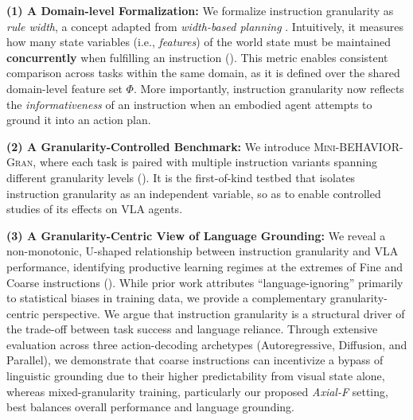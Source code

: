 \documentclass{article}
\begin{document}


\textbf{(1) A Domain-level Formalization:} We formalize instruction granularity as \emph{rule width}, a concept adapted from \emph{width-based planning} \cite{DBLP:conf/aaai/BonetFG19,DBLP:journals/jair/DrexlerSG24}. Intuitively, it measures how many state variables (i.e., \emph{features}) of the world state must be maintained \textbf{concurrently} when fulfilling an instruction (). This metric enables consistent comparison across tasks within the same domain, as it is defined over the shared domain-level feature set $\Phi$. More importantly, instruction granularity now reflects the \emph{informativeness} of an instruction when an embodied agent attempts to ground it into an action plan.

\textbf{(2) A Granularity-Controlled Benchmark:} We introduce \textsc{Mini-BEHAVIOR-Gran}, where each task is paired with multiple instruction variants spanning different granularity levels (). It is the first-of-kind testbed that isolates instruction granularity as an independent variable, so as to enable controlled studies of its effects on VLA agents.


\textbf{(3) A Granularity-Centric View of Language Grounding:} We reveal a non-monotonic, U-shaped relationship between instruction granularity and VLA performance, identifying productive learning regimes at the extremes of Fine and Coarse instructions (). While prior work attributes ``language-ignoring'' primarily to statistical biases in training data, we provide a complementary granularity-centric perspective. We argue that instruction granularity is a structural driver of the trade-off between task success and language reliance. Through extensive evaluation across three action-decoding archetypes (Autoregressive, Diffusion, and Parallel), we demonstrate that coarse instructions can incentivize a bypass of linguistic grounding due to their higher predictability from visual state alone, whereas mixed-granularity training, particularly our proposed \emph{Axial-F} setting, best balances overall performance and language grounding.


\end{document}
